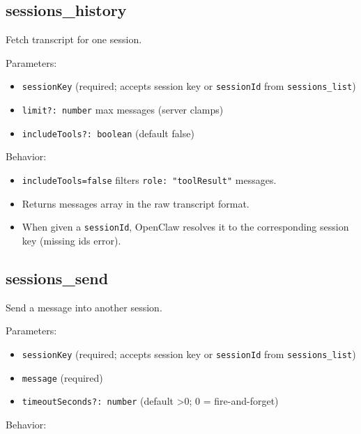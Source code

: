\subsection{sessions\_history}


Fetch transcript for one session.

Parameters:

\begin{itemize}
  \item \texttt{sessionKey} (required; accepts session key or \texttt{sessionId} from \texttt{sessions\_list})
  \item \texttt{limit?: number} max messages (server clamps)
  \item \texttt{includeTools?: boolean} (default false)
\end{itemize}


Behavior:

\begin{itemize}
  \item \texttt{includeTools=false} filters \texttt{role: "toolResult"} messages.
  \item Returns messages array in the raw transcript format.
  \item When given a \texttt{sessionId}, OpenClaw resolves it to the corresponding session key (missing ids error).
\end{itemize}


\subsection{sessions\_send}


Send a message into another session.

Parameters:

\begin{itemize}
  \item \texttt{sessionKey} (required; accepts session key or \texttt{sessionId} from \texttt{sessions\_list})
  \item \texttt{message} (required)
  \item \texttt{timeoutSeconds?: number} (default >0; 0 = fire-and-forget)
\end{itemize}


Behavior:

